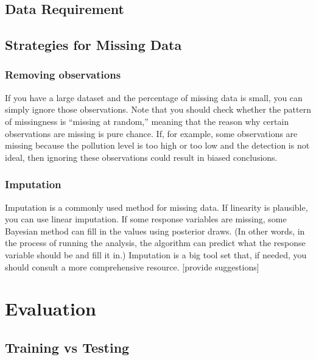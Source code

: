 \documentclass[
]{book}
\begin{document}
\hypertarget{data-requirement}{%
\section{Data Requirement}\label{data-requirement}}

\hypertarget{strategies-for-missing-data}{%
\section{Strategies for Missing Data}\label{strategies-for-missing-data}}

\hypertarget{removing-observations}{%
\subsection{Removing observations}\label{removing-observations}}

If you have a large dataset and the percentage of missing data is small, you can simply ignore those observations. Note that you should check whether the pattern of missingness is ``missing at random,'' meaning that the reason why certain observations are missing is pure chance. If, for example, some observations are missing because the pollution level is too high or too low and the detection is not ideal, then ignoring these observations could result in biased conclusions.

\hypertarget{imputation}{%
\subsection{Imputation}\label{imputation}}

Imputation is a commonly used method for missing data. If linearity is plausible, you can use linear imputation. If some response variables are missing, some Bayesian method can fill in the values using posterior draws. (In other words, in the process of running the analysis, the algorithm can predict what the response variable should be and fill it in.) Imputation is a big tool set that, if needed, you should consult a more comprehensive resource. {[}provide suggestions{]}

\hypertarget{evaluation}{%
\chapter{Evaluation}\label{evaluation}}

\hypertarget{training-vs-testing}{%
\section{Training vs Testing}\label{training-vs-testing}}
\end{document}
